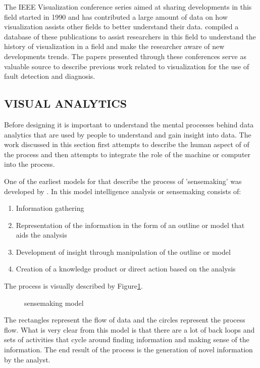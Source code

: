 The IEEE Visualization conference series aimed at sharing developments in this field started in 1990 and has contributed a large amount of data on how visualization assists other fields to better understand their data. \cite{isenberg2016vispubdata} compiled a database of these publications to assist researchers in this field to understand the history of visualization in a field and make the researcher aware of new developments trends. The papers presented through these conferences serve as valuable source to describe previous work related to visualization for the use of fault detection and diagnosis.

\subsection{VISUAL ANALYTICS}

Before designing it is important to understand the mental processes behind data analytics that are used by people to understand and gain insight into data. The work discussed in this section first attempts to describe the human aspect of of the process and then attempts to integrate the role of the machine or computer into the process.

One of the earliest  models for that describe the process of 'sensemaking' was developed by \cite{pirolli2005sensemaking}. In this model intelligence analysis or sensemaking  consists of:
\begin{enumerate}
	\item Information gathering
	\item Representation of the information in the form of an outline or model that aids the analysis
	\item Development of insight through manipulation of the outline or model
	\item Creation of a knowledge product or direct action based on the analysis
\end{enumerate}
The process is visually described by Figure\ref{fig:3}.
\begin{figure}[!ht]
	\centering{}
	\caption{\cite{pirolli2005sensemaking} sensemaking model}\label{fig:3}
\end{figure}

The rectangles represent the flow of data and the circles represent the process flow. What is very clear from this model is that there are a lot of back loops and sets of activities that cycle around finding information and making sense of the information. The end result of the process is the generation of novel information by the analyst.

